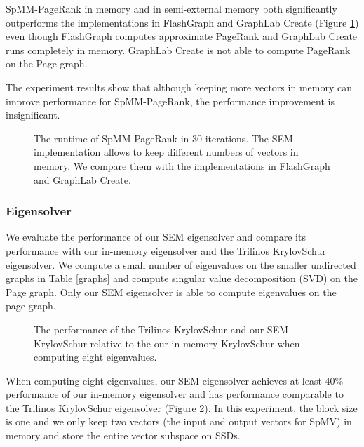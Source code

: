 SpMM-PageRank in memory and in semi-external memory both significantly outperforms
the implementations in FlashGraph and GraphLab Create (Figure \ref{perf:pagerank})
even though FlashGraph computes approximate PageRank and GraphLab Create runs
completely in memory. GraphLab Create is not able to compute PageRank on the Page
graph.

The experiment results show that although keeping more vectors in memory can
improve performance for SpMM-PageRank, the performance improvement is insignificant.

\begin{figure}
	\begin{center}
		\footnotesize
		
		\caption{The runtime of SpMM-PageRank in 30 iterations. The SEM
			implementation allows to keep different numbers of vectors in memory.
			We compare them with the implementations in FlashGraph and GraphLab
		Create.}
		\label{perf:pagerank}
	\end{center}
\end{figure}

\subsubsection{Eigensolver}

We evaluate the performance of our SEM eigensolver and compare its performance
with our in-memory eigensolver and the Trilinos KrylovSchur eigensolver.
We compute a small number of eigenvalues on the smaller undirected graphs
in Table \ref{graphs} and compute singular value decomposition (SVD) on
the Page graph. Only our SEM eigensolver is able to compute eigenvalues
on the page graph.

\begin{figure}
	\begin{center}
		\footnotesize
		
		\caption{The performance of the Trilinos KrylovSchur and our SEM KrylovSchur
		relative to the our in-memory KrylovSchur when computing eight eigenvalues.}
		\label{fig:eigen}
	\end{center}
\end{figure}

When computing eight eigenvalues, our SEM eigensolver achieves at least 40\%
performance of our in-memory eigensolver and has performance comparable to
the Trilinos KrylovSchur eigensolver (Figure \ref{fig:eigen}).
In this experiment, the block size is one and we only keep two vectors
(the input and output vectors for SpMV) in memory and store the entire
vector subspace on SSDs.

